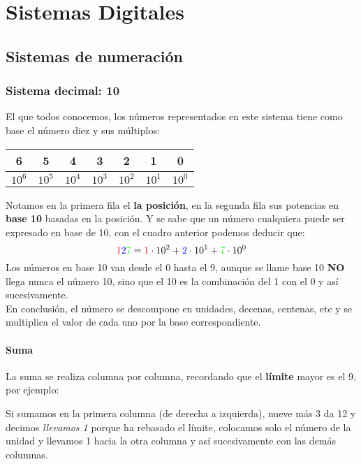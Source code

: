 \documentclass[
	12pt, %
	fleqn, %
	a4paper, %
]{LegrandOrangeBook}
\begin{document}
\part{Sistemas Digitales}
\chapter{Sistemas de numeración}
\section{Sistema decimal: 10}
El que todos conocemos, los números representados en este sistema tiene como base el número diez y sus múltiplos:
\begin{center}
\begin{tabular}{|c|c|c|c|c|c|c|}
\hline
6      & 5      & 4      & 3      & 2      & 1      & 0      \\ \hline
$10^6$ & $10^5$ & $10^4$ & $10^3$ & $10^2$ & $10^1$ & $10^0$ \\ \hline
\end{tabular}
\end{center}
Notamos en la primera fila el \textbf{la posición}, en la segunda fila sus potencias en \textbf{base 10} basadas en la posición. Y se sabe que un número cualquiera puede ser expresado en base de 10, con el cuadro anterior podemos deducir que:
\begin{displaymath}
\textcolor{red}{1}\textcolor{blue}{2}\textcolor{green}{7}=\textcolor{red}{1}\cdot 10^2 + \textcolor{blue}{2}\cdot 10^1 + \textcolor{green}{7}\cdot 10^0
\end{displaymath}
Los números en base 10 van desde el 0 hasta el 9, aunque se llame base 10 \textbf{NO} llega nunca el número 10, sino que el 10 es la combinación del 1 con el 0 y así sucesivamente.\\
En conclusión, el número se descompone en unidades, decenas, centenas, etc y se multiplica el valor de cada uno por la base correspondiente.
\subsection{Suma}
La suma se realiza columna por columna, recordando que el \textbf{límite} mayor es el 9, por ejemplo:
\begin{center}
\end{center}
Si sumamos en la primera columna (de derecha a izquierda), nueve más 3 da 12 y decimos \textit{llevamos 1} porque ha rebasado el límite, colocamos solo el número de la unidad y llevamos 1 hacia la otra columna y así sucesivamente con las demás columnas.
\end{document}
